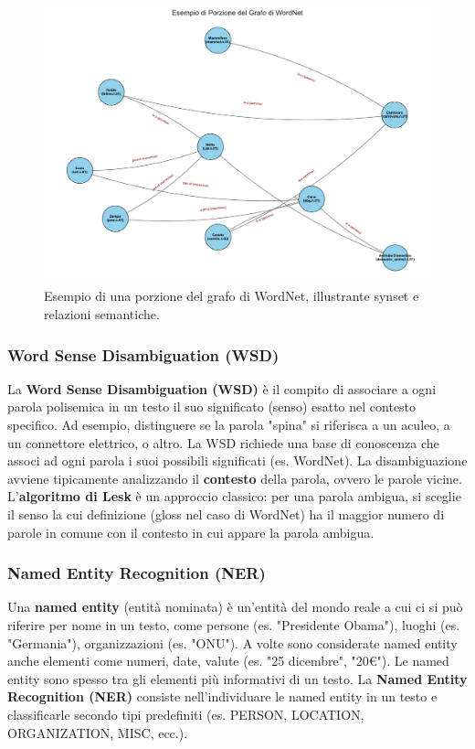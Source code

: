 \documentclass{article}
\begin{document}
\begin{figure}[H]
    \centering
    \includegraphics[width=\textwidth]{images/wordnet_graph_example.pdf}
    \caption{Esempio di una porzione del grafo di WordNet, illustrante synset e relazioni semantiche.}
    \label{fig:wordnet_graph}
\end{figure}

\subsubsection{Word Sense Disambiguation (WSD)}
La \textbf{Word Sense Disambiguation (WSD)} è il compito di associare a ogni parola polisemica in un testo il suo significato (senso) esatto nel contesto specifico. Ad esempio, distinguere se la parola "spina" si riferisca a un aculeo, a un connettore elettrico, o altro.
La WSD richiede una base di conoscenza che associ ad ogni parola i suoi possibili significati (es. WordNet). La disambiguazione avviene tipicamente analizzando il \textbf{contesto} della parola, ovvero le parole vicine.
L'\textbf{algoritmo di Lesk} è un approccio classico: per una parola ambigua, si sceglie il senso la cui definizione (gloss nel caso di WordNet) ha il maggior numero di parole in comune con il contesto in cui appare la parola ambigua.

\subsubsection{Named Entity Recognition (NER)}
Una \textbf{named entity} (entità nominata) è un'entità del mondo reale a cui ci si può riferire per nome in un testo, come persone (es. "Presidente Obama"), luoghi (es. "Germania"), organizzazioni (es. "ONU"). A volte sono considerate named entity anche elementi come numeri, date, valute (es. "25 dicembre", "20€"). Le named entity sono spesso tra gli elementi più informativi di un testo.
La \textbf{Named Entity Recognition (NER)} consiste nell'individuare le named entity in un testo e classificarle secondo tipi predefiniti (es. PERSON, LOCATION, ORGANIZATION, MISC, ecc.).
\end{document}
